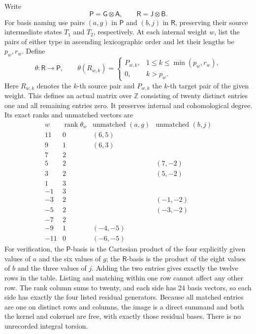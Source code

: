 Write
\[
 \mathsf P=\mathsf G\otimes\mathsf A,\qquad
 \mathsf R=\mathsf J\otimes\mathsf B.
\]
For basis naming use pairs \((a,g)\) in \(\mathsf P\) and \((b,j)\)
in \(\mathsf R\), preserving their source intermediate states
\(T_1\) and \(T_2\), respectively. At each internal weight \(w\),
list the pairs of either type in ascending lexicographic order and
let their lengths be \(p_w,r_w\). Define
\[
 \theta:\mathsf R\longrightarrow\mathsf P,
 \qquad
 \theta(R_{w,k})=
 \begin{cases}P_{w,k},&1\leq k\leq\min(p_w,r_w),\\
 0,&k>p_w.
 \end{cases}
\]
Here \(R_{w,k}\) denotes the \(k\)-th source pair and \(P_{w,k}\)
the \(k\)-th target pair of the given weight. This defines an actual
matrix over \(\mathbb Z\) consisting of twenty distinct entries one
and all remaining entries zero. It preserves internal and cohomological
degree. Its exact ranks and unmatched vectors are
\[
\begin{array}{c|r|l|l}
w&\operatorname{rank}\theta_w&\text{unmatched }(a,g)
                                      &\text{unmatched }(b,j)\\\hline
11&0&(6,5)&\\
9&1&(6,3)&\\
7&2&&\\
5&2&&(7,-2)\\
3&2&&(5,-2)\\
1&3&&\\
-1&3&&\\
-3&2&&(-1,-2)\\
-5&2&&(-3,-2)\\
-7&2&&\\
-9&1&(-4,-5)&\\
-11&0&(-6,-5)&
\end{array}
\]
For verification, the \(\mathsf P\)-basis is the Cartesian product
of the four explicitly given values of \(a\) and the six values of
\(g\); the \(\mathsf R\)-basis is the product of the eight values
of \(b\) and the three values of \(j\). Adding the two entries gives
exactly the twelve rows in the table. Listing and matching within one
row cannot affect any other row. The rank column sums to twenty,
and each side has 24 basis vectors, so each side has exactly the
four listed residual generators. Because all matched entries are
one on distinct rows and columns, the image is a direct summand and
both the kernel and cokernel are free, with exactly those residual
bases. There is no unrecorded integral torsion.

